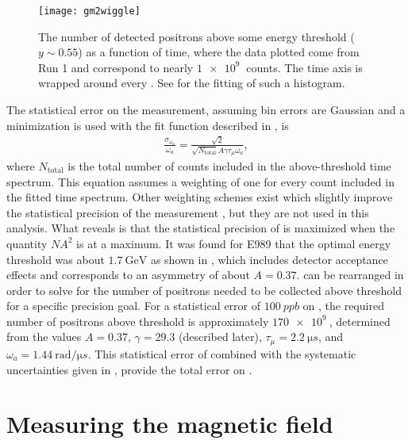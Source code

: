 \begin{figure}[]
    \centering
    \texttt{[image: gm2wiggle]}
    \caption[\gmtwo time spectrum example]{The number of detected positrons above some energy threshold ($y \sim 0.55$) as a function of time, where the data plotted come from Run 1 and correspond to nearly $\SI{1e9}{}$ counts. The time axis is wrapped around every . See  for the fitting of such a histogram.}
    \label{fig:gm2wiggle}
\end{figure}


The statistical error on the \wa measurement, assuming bin errors are Gaussian and a \chisq minimization is used with the fit function described in , is \cite{statisticspaper}
        \begin{align} \label{eq:waprecision}
            \frac{\sigma_{\omega_{a}}}{\omega_{a}} = \frac{\sqrt{2}}{\sqrt{N_{\text{total}}}A\gamma\tau_{\mu}\omega_{a}},
        \end{align}
where $N_{\text{total}}$ is the total number of counts included in the above-threshold time spectrum. This equation assumes a weighting of one for every count included in the fitted time spectrum. Other weighting schemes exist which slightly improve the statistical precision of the \wa measurement \cite{statisticspaper}, but they are not used in this analysis. What  reveals is that the statistical precision of \wa is maximized when the quantity $NA^{2}$ is at a maximum. It was found for E989 that the optimal energy threshold was about $\SI{1.7}{\GeV}$ as shown in , which includes detector acceptance effects and corresponds to an asymmetry of about $A = 0.37$.  can be rearranged in order to solve for the number of positrons needed to be collected above threshold for a specific precision goal. For a statistical error of $\SI{100}{ppb}$ on \wa, the required number of positrons above threshold is approximately $\SI{170e9}{}$, determined from the values $A = 0.37$, $\gamma = 29.3$ (described later), $\tau_{\mu} = \SI{2.2}{\micro s}$, and $\omega_{a} = \SI{1.44}{\text{rad}/\micro s}$. This statistical error of \wa combined with the systematic uncertainties given in , provide the total error on \wa.



\section{Measuring the magnetic field}
\label{sec:MagneticField}


